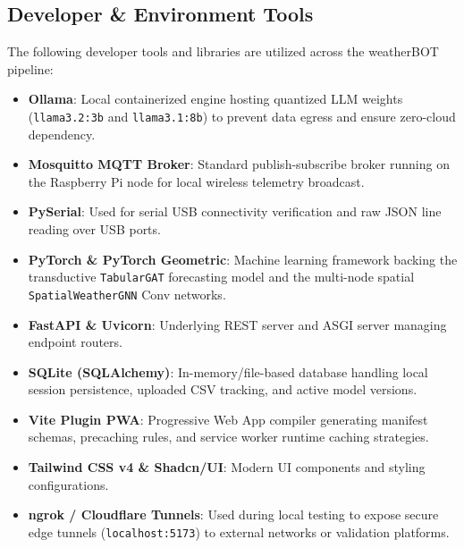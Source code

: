 \documentclass[12pt]{article}
\begin{document}
\subsection{Developer \& Environment Tools}
The following developer tools and libraries are utilized across the weatherBOT pipeline:
\begin{itemize}
    \item \textbf{Ollama}: Local containerized engine hosting quantized LLM weights (\texttt{llama3.2:3b} and \texttt{llama3.1:8b}) to prevent data egress and ensure zero-cloud dependency.
    \item \textbf{Mosquitto MQTT Broker}: Standard publish-subscribe broker running on the Raspberry Pi node for local wireless telemetry broadcast.
    \item \textbf{PySerial}: Used for serial USB connectivity verification and raw JSON line reading over USB ports.
    \item \textbf{PyTorch \& PyTorch Geometric}: Machine learning framework backing the transductive \texttt{TabularGAT} forecasting model and the multi-node spatial \texttt{SpatialWeatherGNN} Conv networks.
    \item \textbf{FastAPI \& Uvicorn}: Underlying REST server and ASGI server managing endpoint routers.
    \item \textbf{SQLite (SQLAlchemy)}: In-memory/file-based database handling local session persistence, uploaded CSV tracking, and active model versions.
    \item \textbf{Vite Plugin PWA}: Progressive Web App compiler generating manifest schemas, precaching rules, and service worker runtime caching strategies.
    \item \textbf{Tailwind CSS v4 \& Shadcn/UI}: Modern UI components and styling configurations.
    \item \textbf{ngrok / Cloudflare Tunnels}: Used during local testing to expose secure edge tunnels (\texttt{localhost:5173}) to external networks or validation platforms.
\end{itemize}
\end{document}
